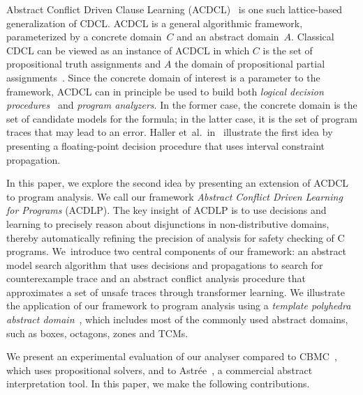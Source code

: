 Abstract Conflict Driven Clause Learning (ACDCL)~\cite{dhk2013-popl} is one
such lattice-based generalization of CDCL.  ACDCL is a general algorithmic
framework, parameterized by a concrete domain~$C$ and an abstract
domain~$A$.  Classical CDCL can be viewed as an instance of ACDCL in which
$C$ is the set of propositional truth assignments and $A$ the domain of
propositional partial assignments~\cite{leo-thesis}.  Since the concrete
domain of interest is a parameter to the framework, ACDCL can in principle
be used to build both \emph{logical decision
procedures}~\cite{DBLP:journals/fmsd/BrainDGHK14} and \emph{program
analyzers}.  In the former case, the concrete domain is the set of candidate
models for the formula; in the latter case, it is the set of program traces
that may lead to an error.  Haller
et~al.~in~\cite{DBLP:journals/fmsd/BrainDGHK14} illustrate the first idea by
presenting a floating-point decision procedure that uses interval constraint
propagation.


In this paper, we explore the second idea by presenting an extension of 
ACDCL to program analysis.  We call our 
framework \emph{Abstract Conflict Driven Learning for Programs}
(ACDLP).  The key insight of ACDLP is to use decisions and learning to precisely 
reason about disjunctions in non-distributive domains, thereby automatically 
refining the precision of analysis for safety checking of C programs.  
We~introduce two central components of our framework: an abstract
model search algorithm that uses decisions and propagations to 
search for counterexample trace and an abstract conflict analysis 
procedure that approximates a set of unsafe traces through transformer 
learning.
We illustrate the application of our framework to program analysis 
using a \textit{template polyhedra abstract domain}~\cite{vmcai05}, 
which includes most of the commonly used abstract domains, such as boxes, 
octagons, zones and TCMs.  

We present an experimental evaluation of our analyser compared 
to CBMC~\cite{cbmc.tacas:2004}, which uses propositional solvers, and to 
Astr{\'e}e~\cite{DBLP:conf/pldi/BlanchetCCFMMMR03}, a commercial abstract 
interpretation tool.  In this paper, we make the following contributions.

